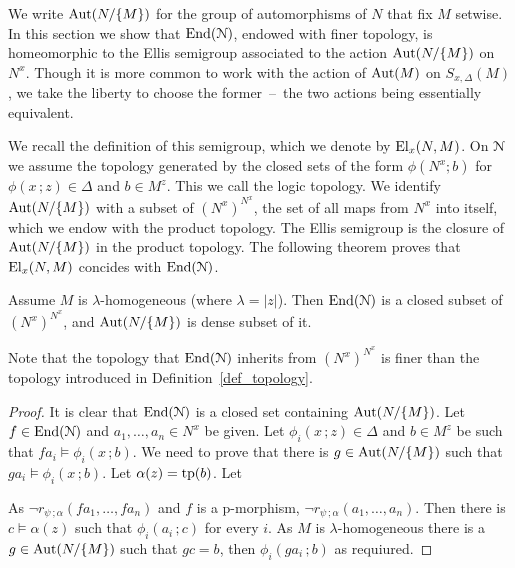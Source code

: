 We write ${\rm Aut}(N/\{M\})$ for the group of automorphisms of $N$ that fix $M$ setwise.
In this section we show that ${\rm End}(\EuScript N)$, endowed with finer topology, is homeomorphic to the Ellis semigroup associated to the action %
${\rm Aut}(N/\{M\})$ on $N^x$.
Though it is more common to work with the action of ${\rm Aut}(M)$ on $S_{x,\Delta}(M)$, we take the liberty to choose the former~--~the two actions being essentially equivalent.

We recall the definition of this semigroup, which we denote by ${\rm El}_x(N,M)$.
On $\EuScript N$ we assume the topology generated by the closed sets of the form $\phi(N^x;b)$ for $\phi(x\,;z)\in\Delta$ and $b\in M^z$\!.
This we call the {logic topology.}
We identify ${\rm Aut}(N/\{M\})$ with a subset of $(N^x)^{N^x}$\!\!, the set of all maps from $N^x$ into itself, which we endow with the product topology.
The Ellis semigroup is the closure of ${\rm Aut}(N/\{M\})$ in the product topology.
The following theorem proves that ${\rm El}_x(N,M)$ concides with ${\rm End}(\EuScript N)$.

\begin{theorem}
  Assume $M$ is $\lambda$-homogeneous (where $\lambda=|z|$).
  Then ${\rm End}(\EuScript N)$ is a closed subset of $(N^x)^{N^x}$\!\!, and ${\rm Aut}(N/\{M\})$ is dense subset of it.
\end{theorem}

Note that the topology that ${\rm End}(\EuScript N)$ inherits from $(N^x)^{N^x}$\! is finer than the topology introduced in Definition~\ref{def_topology}.

\begin{proof}
  It is clear that ${\rm End}(\EuScript N)$ is a closed set containing ${\rm Aut}(N/\{M\})$.
  Let $f\in{\rm End}(\EuScript N)$ and $a_1,\dots,a_n\in N^x$ be given.
  Let $\phi_i(x\,;z)\in\Delta$ and $b\in M^z$ be such that $fa_i\models\phi_i(x\,;b)$.
  We need to prove that there is $g\in{\rm Aut}(N/\{M\})$ such that $ga_i\models\phi_i(x\,;b)$.
  Let $\alpha(z)={\rm tp}(b)$.
  Let


  As $\neg r_{\psi\,;\alpha}(fa_1,\dots,fa_n)$ and $f$ is a p-morphism, $\neg r_{\psi\,;\alpha}(a_1,\dots,a_n)$.
  Then there is $c\models\alpha(z)$ such that $\phi_i(a_i\,;c)$ for every $i$.
  As $M$ is $\lambda$-homogeneous there is a $g\in{\rm Aut}(N/\{M\})$ such that $gc=b$, then $\phi_i(ga_i\,;b)$ as requiured.
\end{proof}

